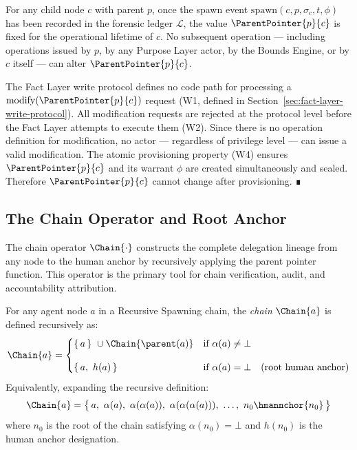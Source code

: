 \begin{prop}
\label{prop:parent-pointer-immutable}
For any child node $c$ with parent $p$, once the spawn event $\mathrm{spawn}(c, p, \sigma_c, t, \phi)$ has been recorded in the forensic ledger $\mathcal{L}$, the value $\ParentPointer{p}{c}$ is fixed for the operational lifetime of $c$. No subsequent operation --- including operations issued by $p$, by any Purpose Layer actor, by the Bounds Engine, or by $c$ itself --- can alter $\ParentPointer{p}{c}$.
\end{prop}

\begin{pf}
The Fact Layer write protocol defines no code path for processing a $\mathrm{modify}(\ParentPointer{p}{c})$ request (W1, defined in Section~\ref{sec:fact-layer-write-protocol}). All modification requests are rejected at the protocol level before the Fact Layer attempts to execute them (W2). Since there is no operation definition for modification, no actor --- regardless of privilege level --- can issue a valid modification. The atomic provisioning property (W4) ensures $\ParentPointer{p}{c}$ and its warrant $\phi$ are created simultaneously and sealed. Therefore $\ParentPointer{p}{c}$ cannot change after provisioning. ∎
\end{pf}

\subsection{The Chain Operator and Root Anchor}
\label{sec:chain-operator}

The chain operator $\Chain{\cdot}$ constructs the complete delegation lineage from any node to the human anchor by recursively applying the parent pointer function. This operator is the primary tool for chain verification, audit, and accountability attribution.

\begin{dfn}
\label{def:chain-operator}
For any agent node $a$ in a Recursive Spawning chain, the \emph{chain} $\Chain{a}$ is defined recursively as:
\begin{equation}
\Chain{a} =
\begin{cases}
\{\,a\,\}\ \cup \Chain{\parent(a)} & \text{if } \alpha(a) \neq \bot \\[10pt]
\{\,a,\ h(a)\,\} & \text{if } \alpha(a) = \bot \quad \text{(root human anchor)}
\end{cases}
\label{eq:chain-operator}
\end{equation}
Equivalently, expanding the recursive definition:
\begin{equation}
\Chain{a} = \bigl\{\, a,\ \alpha(a),\ \alpha(\alpha(a)),\ \alpha(\alpha(\alpha(a))),\ \ldots,\ n_0 \hmannchor{n_0} \,\bigr\}
\label{eq:chain-expanded}
\end{equation}
where $n_0$ is the root of the chain satisfying $\alpha(n_0) = \bot$ and $h(n_0)$ is the human anchor designation.
\end{dfn}

